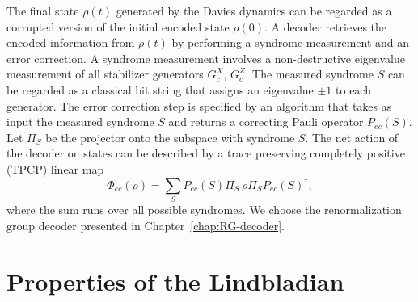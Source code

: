 The final state $\rho(t)$ generated by the Davies dynamics 
can be regarded as a corrupted version of the initial encoded state $\rho(0)$.
A decoder retrieves the encoded information from $\rho(t)$
by performing a syndrome measurement and an error correction.
A syndrome measurement involves a non-destructive eigenvalue measurement 
of all stabilizer generators $G^X_c$, $G^Z_c$.
The measured syndrome $S$ can be regarded 
as a classical bit string that assigns an eigenvalue $\pm 1$ to each generator. 
The error correction step is specified by an algorithm 
that takes as input the measured syndrome $S$ 
and returns a correcting Pauli operator $P_{ec}(S)$.
Let $\Pi_S$ be the projector onto the subspace with syndrome $S$.
The net action of the decoder on states can be described
by  a trace preserving completely positive (TPCP) linear map
\begin{equation}
\label{decoder}
\Phi_{ec}(\rho)=\sum_S P_{ec}(S)\Pi_S \, \rho \Pi_S P_{ec}(S)^\dag,
\end{equation}
where the sum runs over all possible syndromes.
We choose the renormalization group decoder
presented in Chapter~\ref{chap:RG-decoder}.


\section{Properties of the Lindbladian}

